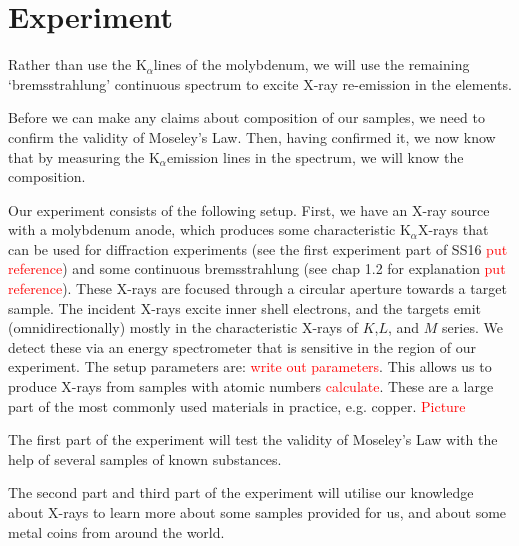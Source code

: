 \documentclass[11pt,a4paper,twoside,onecolumn]{article}
\newcommand{\reminder}[1]{\textcolor{red}{#1}}
\newcommand{\Kalpha}{$\mathrm{K}_\alpha$}
\begin{document}
\section{Experiment}

Rather than use the \Kalpha lines of the molybdenum, we will use the remaining `bremsstrahlung' continuous spectrum to excite X-ray re-emission in the elements.

Before we can make any claims about composition of our samples, we need to confirm the validity of Moseley's Law. Then, having confirmed it, we now know that by measuring the \Kalpha emission lines in the spectrum, we will know the composition.

Our experiment consists of the following setup. First, we have an X-ray source with a molybdenum anode, which produces some characteristic \Kalpha X-rays that can be used for diffraction experiments (see the first experiment part of SS16 \reminder{put reference}) and some continuous bremsstrahlung (see chap 1.2 for explanation \reminder{put reference}). These X-rays are focused through a circular aperture towards a target sample. The incident X-rays excite inner shell electrons, and the targets emit (omnidirectionally) mostly in the characteristic X-rays of $K$,$L$, and $M$ series. We detect these via an energy spectrometer that is sensitive in the region of our experiment. The setup parameters are:  \reminder{write out parameters}. This allows us to produce X-rays from samples with atomic numbers \reminder{calculate}. These are a large part of the most commonly used materials in practice, e.g. copper. \reminder{Picture}

The first part of the experiment will test the validity of Moseley's Law with the help of several samples of known substances.

The second part and third part of the experiment will utilise our knowledge about X-rays to learn more about some samples provided for us, and about some metal coins from around the world.

\end{document}
